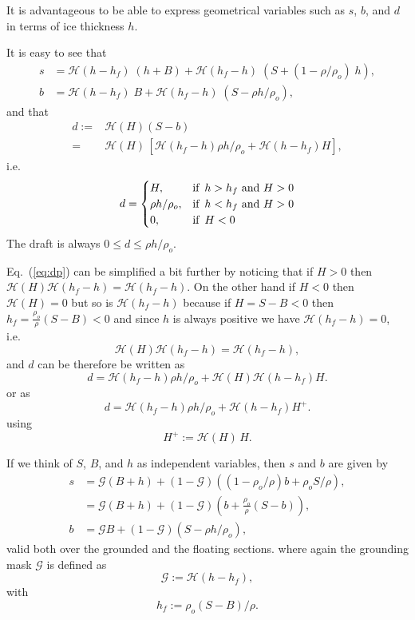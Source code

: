 \documentclass[10pt,a4paper]{book}
\newcommand{\He}{\mathcal{H}}
\newcommand{\G}{\mathcal{G}}
\begin{document}
It is advantageous to be able to express geometrical variables such as $s$, $b$, and $d$ in terms of ice
thickness $h$.

It is easy to see that
\begin{align}
s&= \He(h-h_f) \; (h+ B) + \He(h_f-h) \; (S+(1-\rho/\rho_o)\; h ) ,\label{eq:sh} \\
b&=\He(h-h_f) \; B + \He(h_f-h) \; (S-\rho h/\rho_o), \label{eq:bh}
\end{align}
and that
\begin{align}
  d  :=&\He(H) (S-b)  \\
     =&\He(H) \, [ \He(h_f-h) \rho h/\rho_o + \He(h-h_f) H ] ,
\label{eq:dp}
\end{align}
i.e.\ 
\[
d=\begin{cases} 
H , & \mbox{if } \, h>h_f \mbox{ and } H>0 \\  
\rho h /\rho_o , & \hbox{if } \,  h<h_f \mbox{ and } H>0\\
0 , & \hbox{if } \,  H<0  \
\end{cases}
\]
The draft is always $0\le d \le \rho h /\rho_o $.

Eq.~(\ref{eq:dp}) can be simplified a bit further by noticing that 
if $H>0$ then $\He(H) \He(h_f-h)=\He(h_f-h)$. On the other
hand if $H<0$ then $\He(H)=0$ but so is $\He(h_f-h)$ because if $H=S-B<0$ then 
$h_f=\frac{\rho_o}{\rho}(S-B) < 0$ and since $h$ is always positive we have
$\He(h_f-h)=0$, i.e.\
\[
\He(H) \He(h_f-h)=\He(h_f-h),
\]
and $d$ can be therefore be written as
\begin{equation}
d=  \He(h_f-h) \rho h/\rho_o + \He(H) \He(h-h_f) H .
\label{eq:dp2}
\end{equation}
or as
\begin{equation}
d=  \He(h_f-h) \rho h/\rho_o + \He(h-h_f) H^{+} .
\label{eq:dp3}
\end{equation}
using
\[
H^{+}:= \He(H) \, H. 
\]


If we think of $S$, $B$, and $h$ as independent variables, then $s$ and $b$ are given by
\begin{align}
  s & = \G (B+h) + (1-\G) \left ((1-\rho_o/\rho) b +\rho_o S/\rho \right ),\\
    & = \G (B+h) + (1-\G) \left (b+ \frac{\rho_o}{\rho} (S-b) \right ),\\
  b & = \G B + (1-\G) ( S - \rho h /\rho_o),
\end{align}
valid both over the grounded and the floating sections.
where again the grounding mask $\G$ is defined as
\[
\G:=\He(h-h_f) ,
\]
with
\[
h_f:=\rho_o (S-B) /\rho .
\]
\end{document}
